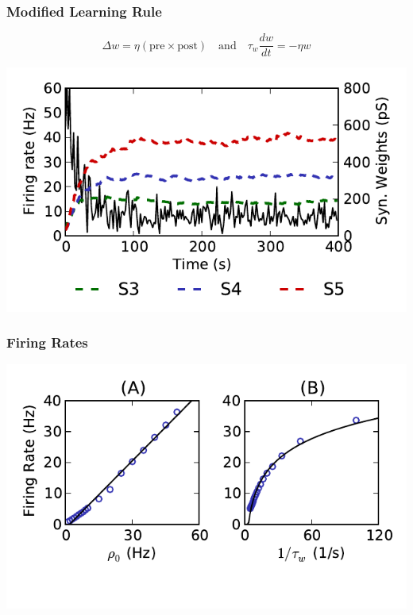 \documentclass{beamer}
\begin{document}
\begin{frame} \frametitle{Modified Learning Rule}
    \begin{equation*}
        \Delta w = \eta(\text{pre} \times \text{post})
        \quad\text{and}\quad
        \tau_w \frac{dw}{dt} = -\eta w
    \end{equation*}
    \begin{center}
        \includegraphics[width=\textwidth]{figures/evo_exp_decay}
    \end{center}
\end{frame}

\begin{frame} \frametitle{Firing Rates}
    \begin{center}
        \includegraphics[width=\textwidth]{figures/rates}
    \end{center}
\end{frame}
\end{document}
